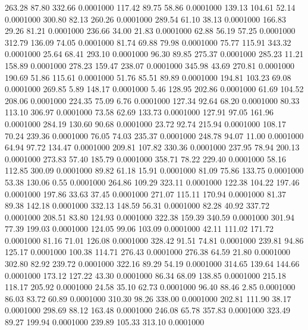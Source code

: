  263.28   87.80  332.66   0.0001000
 117.42   89.75   58.86   0.0001000
 139.13  104.61   52.14   0.0001000
 300.80   82.13  260.26   0.0001000
 289.54   61.10   38.13   0.0001000
 166.83   29.26   81.21   0.0001000
 236.66   34.00   21.83   0.0001000
  62.88   56.19   57.25   0.0001000
 312.79  136.09   74.05   0.0001000
  81.74   69.88   79.98   0.0001000
  75.77  115.91  343.32   0.0001000
  25.64   68.41  293.10   0.0001000
  96.30   89.85  275.37   0.0001000
 285.23   11.21  158.89   0.0001000
 278.23  159.47  238.07   0.0001000
 345.98   43.69  270.81   0.0001000
 190.69   51.86  115.61   0.0001000
  51.76   85.51   89.89   0.0001000
 194.81  103.23   69.08   0.0001000
 269.85    5.89  148.17   0.0001000
   5.46  128.95  202.86   0.0001000
  61.69  104.52  208.06   0.0001000
 224.35   75.09    6.76   0.0001000
 127.34   92.64   68.20   0.0001000
  80.33  113.10  306.97   0.0001000
  73.58   62.69  133.73   0.0001000
 127.91   97.05  161.96   0.0001000
 284.19  130.60   90.68   0.0001000
  23.72   92.74  215.94   0.0001000
 108.17   70.24  239.36   0.0001000
  76.05   74.03  235.37   0.0001000
 248.78   94.07   11.00   0.0001000
  64.94   97.72  134.47   0.0001000
 209.81  107.82  330.36   0.0001000
 237.95   78.94  200.13   0.0001000
 273.83   57.40  185.79   0.0001000
 358.71   78.22  229.40   0.0001000
  58.16  112.85  300.09   0.0001000
  89.82   61.18   15.91   0.0001000
  81.09   75.86  133.75   0.0001000
  53.38  130.06    0.55   0.0001000
 264.86  109.29  323.11   0.0001000
 122.38  104.22  197.46   0.0001000
 197.86   33.63   37.45   0.0001000
 271.07  115.11  170.94   0.0001000
  81.37   89.38  142.18   0.0001000
 332.13  148.59   56.31   0.0001000
  82.28   40.92  337.72   0.0001000
 208.51   83.80  124.93   0.0001000
 322.38  159.39  340.59   0.0001000
 301.94   77.39  199.03   0.0001000
 124.05   99.06  103.09   0.0001000
  42.11  111.02  171.72   0.0001000
  81.16   71.01  126.08   0.0001000
 328.42   91.51   74.81   0.0001000
 239.81   94.86  125.17   0.0001000
 100.38  114.71  276.43   0.0001000
 276.38   64.59   21.80   0.0001000
 302.80   82.92  239.72   0.0001000
 322.16   89.29   54.19   0.0001000
 314.65  139.64  144.66   0.0001000
 173.12  127.22   43.30   0.0001000
  86.34   68.09  138.85   0.0001000
 215.18  118.17  205.92   0.0001000
  24.58   35.10   62.73   0.0001000
  96.40   88.46    2.85   0.0001000
  86.03   83.72   60.89   0.0001000
 310.30   98.26  338.00   0.0001000
 202.81  111.90   38.17   0.0001000
 298.69   88.12  163.48   0.0001000
 246.08   65.78  357.83   0.0001000
 323.49   89.27  199.94   0.0001000
 239.89  105.33  313.10   0.0001000
